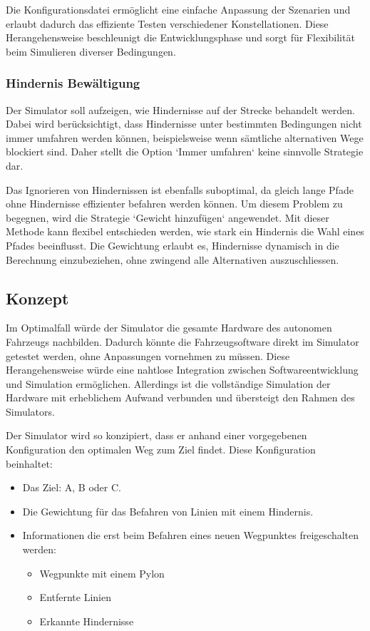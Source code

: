 \documentclass[../main.tex]{subfiles}
\begin{document}
Die Konfigurationsdatei ermöglicht eine einfache Anpassung der Szenarien und erlaubt dadurch das effiziente Testen verschiedener Konstellationen. Diese Herangehensweise beschleunigt die Entwicklungsphase und sorgt für Flexibilität beim Simulieren diverser Bedingungen.

\subsubsection{Hindernis Bewältigung}

Der Simulator soll aufzeigen, wie Hindernisse auf der Strecke behandelt werden.
Dabei wird berücksichtigt, dass Hindernisse unter bestimmten Bedingungen nicht immer umfahren werden können, beispielsweise wenn sämtliche alternativen Wege blockiert sind. Daher stellt die Option `Immer umfahren` keine sinnvolle Strategie dar.

Das Ignorieren von Hindernissen ist ebenfalls suboptimal, da gleich lange Pfade ohne Hindernisse effizienter befahren werden können. Um diesem Problem zu begegnen, wird die Strategie `Gewicht hinzufügen` angewendet. Mit dieser Methode kann flexibel entschieden werden, wie stark ein Hindernis die Wahl eines Pfades beeinflusst. Die Gewichtung erlaubt es, Hindernisse dynamisch in die Berechnung einzubeziehen, ohne zwingend alle Alternativen auszuschliessen.

\subsection{Konzept}

Im Optimalfall würde der Simulator die gesamte Hardware des autonomen Fahrzeugs nachbilden. Dadurch könnte die Fahrzeugsoftware direkt im Simulator getestet werden, ohne Anpassungen vornehmen zu müssen. Diese Herangehensweise würde eine nahtlose Integration zwischen Softwareentwicklung und Simulation ermöglichen. Allerdings ist die vollständige Simulation der Hardware mit erheblichem Aufwand verbunden und übersteigt den Rahmen des Simulators.

Der Simulator wird so konzipiert, dass er anhand einer vorgegebenen Konfiguration den optimalen Weg zum Ziel findet. Diese Konfiguration beinhaltet:
\begin{itemize}
    \item Das Ziel: A, B oder C.
    \item Die Gewichtung für das Befahren von Linien mit einem Hindernis.
    \item Informationen die erst beim Befahren eines neuen Wegpunktes freigeschalten werden:
     \begin{itemize}
        \item Wegpunkte mit einem Pylon 
        \item Entfernte Linien
        \item Erkannte Hindernisse
   \end{itemize}
\end{itemize}
\end{document}
